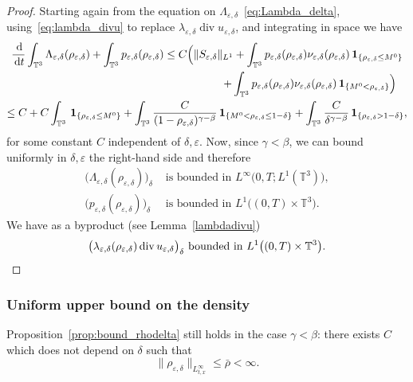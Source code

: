 \documentclass[10pt]{amsart}
\newcommand{\<}{\bigl\langle}
\renewcommand{\>}{\bigr\rangle}
\newcommand{\labeleq}[1]{}
\theoremstyle{definition}
\theoremstyle{remark}
\newcommand{\TT}{\mathbb{T}^3}
\DeclareMathOperator{\Div}{div}
\newcommand{\di}{\,\mathrm{d}}
\let\ep\varepsilon
\begin{document}
\begin{proof} Starting again from the equation on $\Lambda_{\ep,\delta}$~\eqref{eq:Lambda_delta}, using~\eqref{eq:lambda_divu} to replace $\lambda_{\ep,\delta} \Div u_{\ep,\delta}$, and integrating in space we have
\begin{multline*}{\labeleq{control-Lambda}}
\dfrac{\di}{\di t} \int_{\TT}{\Lambda_{\ep,\delta}(\rho_{\ep,\delta})} + \int_{\TT}{p_{\ep,\delta}(\rho_{\ep,\delta})}
\leq C \Big(\|S_{\ep,\delta}\|_{L^1} + \int_{\TT}{p_{\ep,\delta}(\rho_{\ep,\delta}) \nu_{\ep,\delta}(\rho_{\ep,\delta}) \,\mathbf{1}_{\{\rho_{\ep,\delta} \leq M^0\}}}\\
\shoveright{+ \int_{\TT}{p_{\ep,\delta}(\rho_{\ep,\delta}) \nu_{\ep,\delta}(\rho_{\ep,\delta}) \,\mathbf{1}_{\{M^0 < \rho_{\ep,\delta} \}}} \Big)}\\
\leq C + C \int_{\TT}{\,\mathbf{1}_{\{\rho_{\ep,\delta} \leq M^0\}}}
+ \int_{\TT}{ \dfrac{C}{(1-\rho_{\ep,\delta})^{\gamma - \beta}}\,\mathbf{1}_{\{M^0 < \rho_{\ep,\delta} \leq 1-\delta \}}}
+ \int_{\TT}{ \dfrac{C}{\delta^{\gamma - \beta}}\,\mathbf{1}_{\{\rho_{\ep,\delta} > 1-\delta\}} },
\end{multline*}
for some constant $C$ independent of $\delta, \ep$.
Now, since $\gamma < \beta$, we can bound uniformly in $\delta,\ep$ the right-hand side and therefore
\begin{align*}
\big(\Lambda_{\ep,\delta}(\rho_{\ep,\delta})\big)_\delta &\text{ is bounded in } L^\infty\big(0,T;L^1(\TT)\big),\\
\big(p_{\ep,\delta}(\rho_{\ep,\delta})\big)_\delta &\text{ is bounded in } L^1\big((0,T)\times \TT\big).
\end{align*}
We have as a byproduct (see Lemma~\ref{lambdadivu})
\begin{equation*}\labeleq{lambda-delta-2}
\big(\lambda_{\ep,\delta}(\rho_{\ep,\delta}) \Div u_{\ep,\delta}\big)_\delta ~ \text{bounded in}~ L^1\big((0,T)\times \TT\big).\qedhere
\end{equation*}
\end{proof}

\subsubsection*{Uniform upper bound on the density}
Proposition~\ref{prop:bound_rhodelta} still holds in the case $\gamma < \beta$: there exists $C$ which does not depend on $\delta$ such that
\begin{equation}\label{eq:bound_rhodelta_2}
\|\rho_{\ep,\delta}\|_{L^\infty_{t,x}} \leq \bar{\rho} < \infty.
\end{equation}
\end{document}
